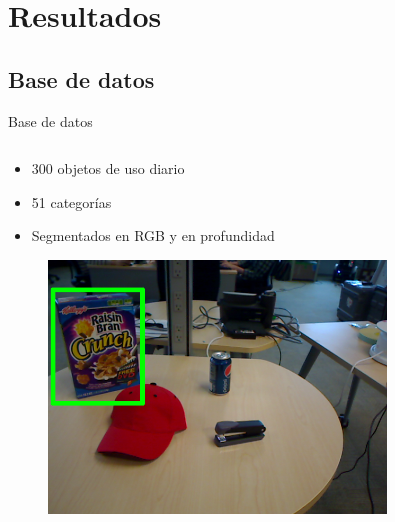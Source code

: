 \documentclass[]{beamer}
\begin{document}
\section{Resultados}
\subsection{Base de datos}
\begin{frame}{Base de datos}



    \begin{columns}[t]
        \begin{column}{5cm}
            \begin{itemize}
                \item 300 objetos de uso diario
                \item 51 categorías
                \item Segmentados en RGB y en profundidad
            \end{itemize}

            \begin{figure}
                \includegraphics[width=0.8\textwidth]{img/base/scene_anotada.png}
            \end{figure}


\end{column}
\end{columns}
\end{frame}
\end{document}
